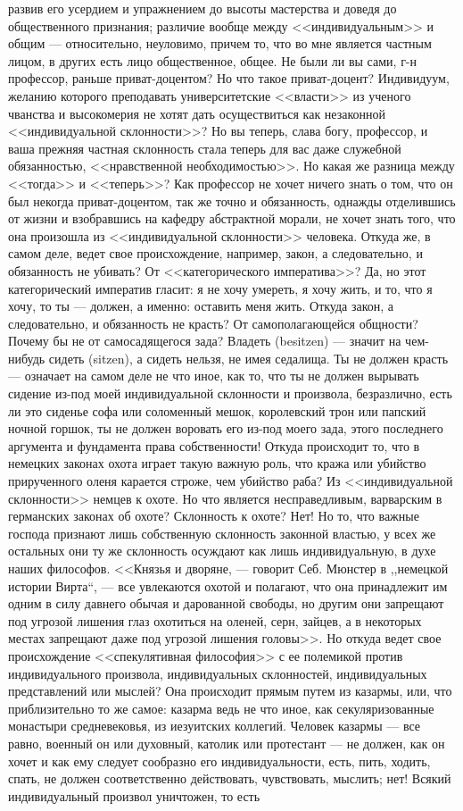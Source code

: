 \documentclass[12pt]{article}
\begin{document}
развив его усердием и упражнением до высоты мастерства и доведя до общественного признания; различие вообще между <<индивидуальным>> и общим --- относительно, неуловимо, причем то, что во мне является частным лицом, в других есть лицо общественное, общее. Не были ли вы сами, г-н профессор, раньше приват-доцентом? Но что такое приват-доцент? Индивидуум, желанию которого преподавать университетские <<власти>> из ученого чванства и высокомерия не хотят дать осуществиться как незаконной <<индивидуальной склонности>>? Но вы теперь, слава богу, профессор, и ваша прежняя частная склонность стала теперь для вас даже служебной обязанностью, <<нравственной необходимостью>>. Но какая же разница между <<тогда>> и <<теперь>>? Как профессор не хочет ничего знать о том, что он был некогда приват-доцентом, так же точно и обязанность, однажды отделившись от жизни и взобравшись на кафедру абстрактной морали, не хочет знать того, что она произошла из <<индивидуальной склонности>> человека. Откуда же, в самом деле, ведет свое происхождение, например, закон, а следовательно, и обязанность не убивать? От <<категорического императива>>? Да, но этот категорический императив гласит: я не хочу умереть, я хочу жить, и то, что я хочу, то ты --- должен, а именно: оставить меня жить. Откуда закон, а следовательно, и обязанность не красть? От самополагающейся общности? Почему бы не от самосадящегося зада? Владеть (besitzen) --- значит на чем-нибудь сидеть (sitzen), а сидеть нельзя, не имея седалища. Ты не должен красть --- означает на самом деле не что иное, как то, что ты не должен вырывать сидение из-под моей индивидуальной склонности и произвола, безразлично, есть ли это сиденье софа или соломенный мешок, королевский трон или папский ночной горшок, ты не должен воровать его из-под моего зада, этого последнего аргумента и фундамента права собственности! Откуда происходит то, что в немецких законах охота играет такую важную роль, что кража или убийство прирученного оленя карается строже, чем убийство раба? Из <<индивидуальной склонности>> немцев к охоте. Но что является несправедливым, варварским в германских законах об охоте? Склонность к охоте? Нет! Но то, что важные господа признают лишь собственную склонность законной властью, у всех же остальных они ту же склонность осуждают как лишь индивидуальную, в духе наших философов. <<Князья и дворяне, --- говорит Себ. Мюнстер в ,,немецкой истории Вирта``, --- все увлекаются охотой и полагают, что она принадлежит им одним в силу давнего обычая и дарованной свободы, но другим они запрещают под угрозой лишения глаз охотиться на оленей, серн, зайцев, а в некоторых местах запрещают даже под угрозой лишения головы>>. Но откуда ведет свое происхождение <<спекулятивная философия>> с ее полемикой против индивидуального произвола, индивидуальных склонностей, индивидуальных представлений или мыслей? Она происходит прямым путем из казармы, или, что приблизительно то же самое: казарма ведь не что иное, как секуляризованные монастыри средневековья, из иезуитских коллегий. Человек казармы --- все равно, военный он или духовный, католик или протестант --- не должен, как он хочет и как ему следует сообразно его индивидуальности, есть, пить, ходить, спать, не должен соответственно действовать, чувствовать, мыслить; нет! Всякий индивидуальный произвол уничтожен, то есть 
\end{document}

